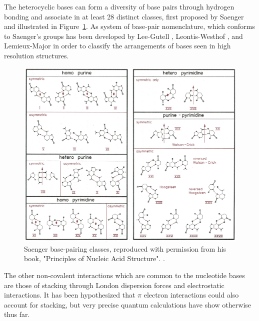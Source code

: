 The  heterocyclic bases  can form  a diversity  of base  pairs through
hydrogen bonding and associate in  at least 28 distinct classes, first
proposed   by   Saenger    \cite{saenger1984}   and   illustrated   in
Figure~\ref{fig:saenger28}. As system of base-pair nomenclature, which
conforms  to  Saenger's  groups   has  been  developed  by  Lee-Gutell
\cite{lee2004}, Leontis-Westhof \cite{leontis2002b}, and Lemieux-Major
\cite{lemieux2002} in order to classify the arrangements of bases seen
in high resolution structures.

\begin{figure}
\centering
\includegraphics[scale=3.8, angle=90]{Chapter1/saenger28c.png}
\caption{Saenger base-pairing classes, reproduced with permission from
  his       book,        "Principles       of       Nucleic       Acid
  Structure". \cite{saenger1984}.}
\label{fig:saenger28}
\end{figure}  

The other non-covalent interactions which are common to the nucleotide
bases  are those  of  stacking through  London  dispersion forces  and
electrostatic  interactions.   It  has  been hypothesized  that  $\pi$
electron  interactions  could  also  account for  stacking,  but  very
precise quantum  calculations \cite{sponer1996, sponer1997}  have show
otherwise thus far.

